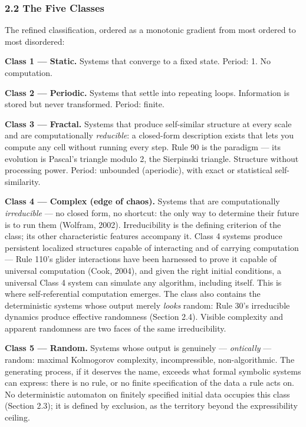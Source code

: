\documentclass[
]{article}
\begin{document}
\hypertarget{the-five-classes}{%
\subsubsection{2.2 The Five Classes}\label{the-five-classes}}

The refined classification, ordered as a monotonic gradient from most
ordered to most disordered:

\textbf{Class 1 --- Static.} Systems that converge to a fixed state.
Period: 1. No computation.

\textbf{Class 2 --- Periodic.} Systems that settle into repeating loops.
Information is stored but never transformed. Period: finite.

\textbf{Class 3 --- Fractal.} Systems that produce self-similar
structure at every scale and are computationally \emph{reducible}: a
closed-form description exists that lets you compute any cell without
running every step. Rule 90 is the paradigm --- its evolution is
Pascal's triangle modulo 2, the Sierpinski triangle. Structure without
processing power. Period: unbounded (aperiodic), with exact or
statistical self-similarity.

\textbf{Class 4 --- Complex (edge of chaos).} Systems that are
computationally \emph{irreducible} --- no closed form, no shortcut: the
only way to determine their future is to run them (Wolfram, 2002).
Irreducibility is the defining criterion of the class; its other
characteristic features accompany it. Class 4 systems produce persistent
localized structures capable of interacting and of carrying computation
--- Rule 110's glider interactions have been harnessed to prove it
capable of universal computation (Cook, 2004), and given the right
initial conditions, a universal Class 4 system can simulate any
algorithm, including itself. This is where self-referential computation
emerges. The class also contains the deterministic systems whose output
merely \emph{looks} random: Rule 30's irreducible dynamics produce
effective randomness (Section 2.4). Visible complexity and apparent
randomness are two faces of the same irreducibility.

\textbf{Class 5 --- Random.} Systems whose output is genuinely ---
\emph{ontically} --- random: maximal Kolmogorov complexity,
incompressible, non-algorithmic. The generating process, if it deserves
the name, exceeds what formal symbolic systems can express: there is no
rule, or no finite specification of the data a rule acts on. No
deterministic automaton on finitely specified initial data occupies this
class (Section 2.3); it is defined by exclusion, as the territory beyond
the expressibility ceiling.
\end{document}
